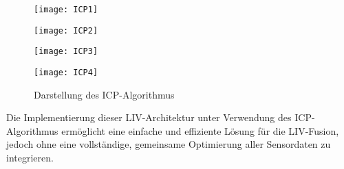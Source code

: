 \begin{figure}[h]
    \centering
    \begin{minipage}{0.24\textwidth}
        \centering
        \texttt{[image: ICP1]}
    \end{minipage}
    \hfill
    \begin{minipage}{0.24\textwidth}
        \centering
        \texttt{[image: ICP2]}
    \end{minipage}
    \hfill
    \begin{minipage}{0.24\textwidth}
        \centering
        \texttt{[image: ICP3]}
    \end{minipage}
    \hfill
    \begin{minipage}{0.24\textwidth}
        \centering
        \texttt{[image: ICP4]}
    \end{minipage}
    \caption{Darstellung des ICP-Algorithmus \cite{bogoslavskyi2017icp}}
    \label{fig:ICP}
\end{figure}

Die Implementierung dieser LIV-Architektur unter Verwendung des ICP-Algorithmus ermöglicht eine einfache und effiziente Lösung für die LIV-Fusion, jedoch ohne eine vollständige, gemeinsame Optimierung aller Sensordaten zu integrieren. \cite{zhang2024lidarslam}